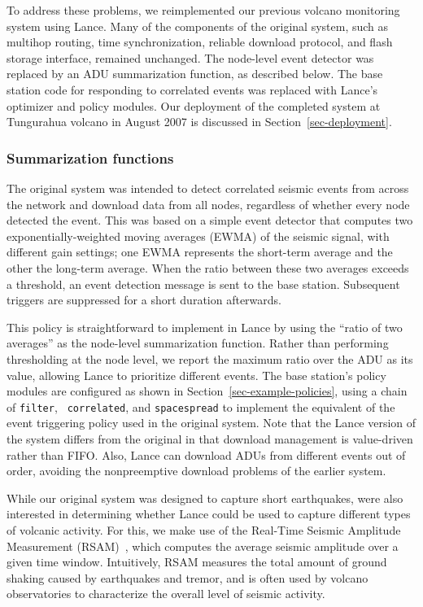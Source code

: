 \documentclass[lettersize]{sig-alternate-konrad}
\begin{document}
To address these problems, we reimplemented our previous volcano
monitoring system using Lance. Many of the components of the original system,
such as multihop routing, time synchronization, reliable download
protocol, and flash storage interface, remained unchanged. 
The node-level event detector was replaced by an ADU summarization function,
as described below. The base station code for responding to
correlated events was replaced with Lance's optimizer and
policy modules. Our deployment of the completed system at Tungurahua
volcano in August 2007 is discussed in Section~\ref{sec-deployment}.

\subsubsection{Summarization functions}
\label{sec-casestudy-nuc}

The original system was intended to detect correlated seismic
events from across the network and download data from all nodes,
regardless of whether every node detected the event. This was based
on a simple event detector that computes two exponentially-weighted
moving averages (EWMA) of the seismic signal, with different gain
settings; one EWMA represents the short-term average and the other
the long-term average. When the ratio between these two averages
exceeds a threshold, an event detection message is sent to the base 
station. Subsequent triggers are suppressed for a short duration
afterwards.

This policy is straightforward to implement in Lance by using the ``ratio of
two averages'' as the node-level summarization function.  Rather than
performing thresholding at the node level, we report the maximum ratio over
the ADU as its value, allowing Lance to prioritize different events. The base
station's policy modules are configured as shown in
Section~\ref{sec-example-policies}, using a chain of {\tt filter}, {\tt
correlated}, and {\tt spacespread} to implement the equivalent of the event
triggering policy used in the original system. Note that the Lance version of
the system differs from the original in that download management is
value-driven rather than FIFO. Also, Lance can download ADUs from different
events out of order, avoiding the nonpreemptive download problems of the
earlier system.

While our original system was designed to capture short earthquakes,
were also interested in determining whether Lance could be used to
capture different types of volcanic activity. For this, we make use of
the Real-Time Seismic Amplitude Measurement (RSAM)~\cite{rsam}, which
computes the average seismic amplitude over a given time window. 
Intuitively, RSAM measures 
the total amount of ground shaking caused by earthquakes and tremor,
and is often used by volcano
observatories to characterize the overall level of seismic activity.
\end{document}
